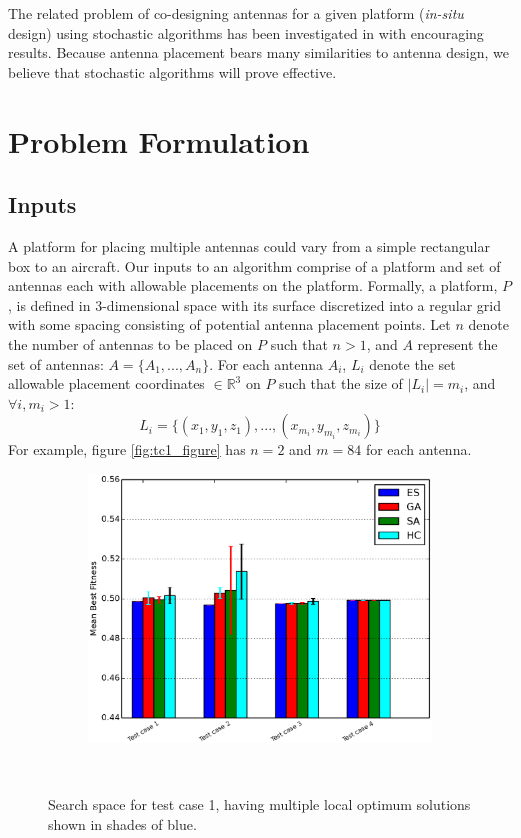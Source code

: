 \documentclass[conference]{IEEEtran}
\begin{document}
The related problem of co-designing antennas for a given platform ({\em in-situ} design) using stochastic algorithms has been investigated in \cite{linden2000wire} with encouraging results. Because antenna placement bears many similarities to antenna design, we believe that stochastic algorithms will prove effective.

\section{Problem Formulation}
\label{sec:problem}
\subsection{Inputs}
\label{sec:inputs}
A platform for placing multiple antennas could vary from a simple rectangular box to an aircraft. Our inputs to an algorithm comprise of a platform and set of antennas each with allowable placements on the platform. Formally, a platform, $P$, is defined in 3-dimensional space with its surface discretized into a regular grid with some spacing consisting of potential antenna placement points. Let $n$ denote the number of antennas to be placed on $P$ such that $n>1$, and $A$ represent the set of antennas: $A = \{A_1, ..., A_n\}$. For each antenna $A_i$, $L_i$ denote the set allowable placement coordinates $\in \mathbb R^3$ on $P$ such that the size of $\mid L_i \mid =m_i$, and $ \forall i, m_i>1$:
\[
L_i = \{(x_{1}, y_{1}, z_{1}), ..., (x_{m_i}, y_{m_i}, z_{m_i})\}
\]
For example, figure \ref{fig:tc1_figure} has $n=2$ and $m=84$ for each antenna.
\begin{figure}%
    \begin{subfigure}{\columnwidth}
        \includegraphics[width=\columnwidth]{FIG/tc_mfwerr}%
    \end{subfigure}\hfill\\
    \caption{Search space for test case 1, having multiple local optimum solutions shown in shades of blue.}%
    \label{fig:tc1_ss}%
\end{figure}
\end{document}
